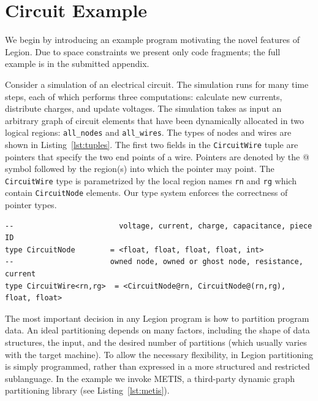 
\section{Circuit Example}
\label{sec:example}


We begin by introducing an example program 
motivating the novel features of Legion.
Due to space constraints we present only code fragments;
the full example is in the submitted appendix.

Consider a simulation of an electrical circuit.
The simulation runs for many time steps, each of which performs three computations:
 calculate new currents, distribute charges, and update voltages.
The simulation takes as input an arbitrary graph of circuit elements
that have been dynamically allocated in two logical regions: {\tt all\_nodes} 
and {\tt all\_wires}.  The types of nodes and wires are 
shown in Listing~\ref{lst:tuples}.  The first two fields in the
{\tt CircuitWire} tuple are pointers that specify the two end points of
a wire.  Pointers are denoted by the @ symbol
followed by the region(s) into which the pointer may point.
The {\tt CircuitWire} type is parametrized by the local region
names {\tt rn} and {\tt rg} which contain {\tt CircuitNode} elements.
Our type system enforces the correctness of pointer types.

\begin{lstlisting}[label={lst:tuples},caption={Tuples and Pointers Example}]
--                        voltage, current, charge, capacitance, piece ID
type CircuitNode        = <float, float, float, float, int>
--                      owned node, owned or ghost node, resistance, current
type CircuitWire<rn,rg>  = <CircuitNode@rn, CircuitNode@(rn,rg), float, float>
\end{lstlisting}

The most important decision in any Legion program is how to partition
program data.  An ideal partitioning depends on many factors,
including the shape of data structures, the input, and the desired number of
partitions (which usually varies with the target machine).  To allow
the necessary flexibility, in Legion partitioning is simply programmed,
rather than expressed in a more structured and restricted
sublanguage.  In the example we invoke METIS\cite{Metis98}, a 
third-party dynamic graph partitioning library (see Listing~\ref{lst:metis}).

